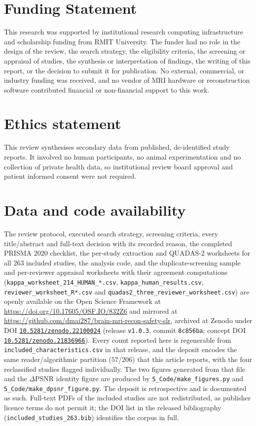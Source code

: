 \documentclass[review,authoryear]{elsarticle}
\begin{document}
\clearpage

\section*{Funding Statement}
This research was supported by institutional research computing infrastructure and scholarship funding from RMIT University. The funder had no role in the design of the review, the search strategy, the eligibility criteria, the screening or appraisal of studies, the synthesis or interpretation of findings, the writing of this report, or the decision to submit it for publication. No external, commercial, or industry funding was received, and no vendor of MRI hardware or reconstruction software contributed financial or non-financial support to this work.


\section*{Ethics statement}
This review synthesises secondary data from published, de-identified study reports. It
involved no human participants, no animal experimentation and no collection of private
health data, so institutional review board approval and patient informed consent were
not required.

\section*{Data and code availability}
The review protocol, executed search strategy, screening criteria, every title/abstract
and full-text decision with its recorded reason, the completed PRISMA 2020 checklist,
the per-study extraction and QUADAS-2 worksheets for all 263 included studies, the
analysis code, and the duplicate-screening sample and per-reviewer appraisal worksheets
with their agreement computations (\texttt{kappa\_worksheet\_214\_HUMAN\_*.csv},
\texttt{kappa\_human\_results.csv}, \texttt{reviewer\_worksheet\_R*.csv} and
\texttt{quadas2\_three\_reviewer\_worksheet.csv}) are openly available on the Open Science Framework at
\url{https://doi.org/10.17605/OSF.IO/832Z6} and mirrored at
\url{https://github.com/dmai287/brain-mri-recon-safety-slr}, archived at Zenodo under
DOI \href{https://doi.org/10.5281/zenodo.22100024}{\nolinkurl{10.5281/zenodo.22100024}}
(release \texttt{v1.0.3}, commit \texttt{8c856ba}; concept DOI
\href{https://doi.org/10.5281/zenodo.21836966}{\nolinkurl{10.5281/zenodo.21836966}}). Every count
reported here is regenerable from \texttt{included\_characteristics.csv} in that
release, and the deposit encodes the same reader/algorithmic partition ($57$/$206$) that
this article reports, with the four reclassified studies flagged individually. The two
figures generated from that file and the $\Delta$PSNR identity figure are produced by
\texttt{5\_Code/make\_figures.py} and \texttt{5\_Code/make\_dpsnr\_figure.py}. The deposit is retrospective and is documented as such. Full-text PDFs of the
included studies are not redistributed, as publisher licence terms do not permit it; the
DOI list in the released bibliography (\texttt{included\_studies\_263.bib})
identifies the corpus in full.
\end{document}

